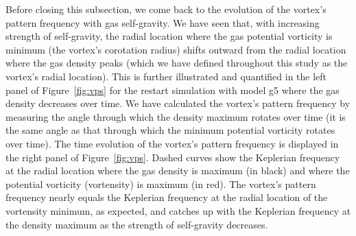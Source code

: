 \documentclass[a4paper,usenatbib]{mnras}
\begin{document}
Before closing this subsection, we come back to the evolution of the
vortex's pattern frequency with gas self-gravity. We have seen that,
with increasing strength of self-gravity, the radial location where
the gas potential vorticity is minimum (the vortex's corotation
radius) shifts outward from the radial location where the gas density
peaks (which we have defined throughout this study as the vortex's
radial location). This is further illustrated and quantified in the
left panel of Figure~\ref{fig:vps} for the restart simulation with
model g5 where the gas density decreases over time. We have calculated
the vortex's pattern frequency by measuring the angle through which
the density maximum rotates over time (it is the same angle as that
through which the minimum potential vorticity rotates over time). The
time evolution of the vortex's pattern frequency is displayed in the
right panel of Figure~\ref{fig:vps}. Dashed curves show the Keplerian
frequency at the radial location where the gas density is maximum (in
black) and where the potential vorticity (vortensity) is maximum (in
red). The vortex's pattern frequency nearly equals the Keplerian
frequency at the radial location of the vortensity minimum, as
expected, and catches up with the Keplerian frequency at the density
maximum as the strength of self-gravity decreases.



\end{document}
